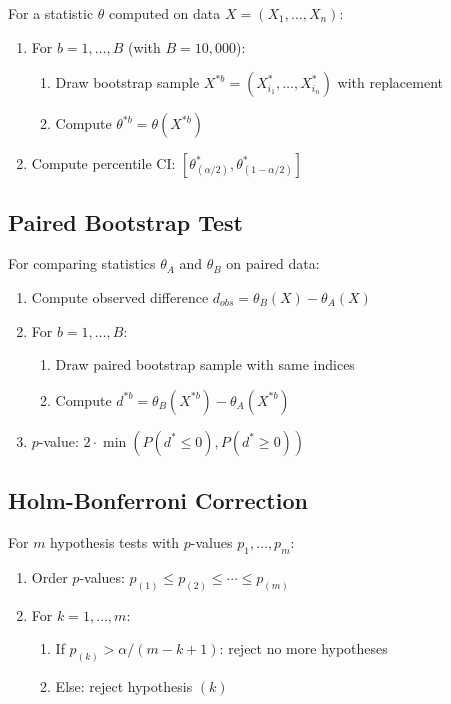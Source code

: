 For a statistic $\theta$ computed on data $X = (X_1, \ldots, X_n)$:

\begin{enumerate}
    \item For $b = 1, \ldots, B$ (with $B = 10,000$):
    \begin{enumerate}
        \item Draw bootstrap sample $X^{*b} = (X_{i_1}^*, \ldots, X_{i_n}^*)$ with replacement
        \item Compute $\theta^{*b} = \theta(X^{*b})$
    \end{enumerate}
    \item Compute percentile CI: $[\theta^*_{(\alpha/2)}, \theta^*_{(1-\alpha/2)}]$
\end{enumerate}

\subsection{Paired Bootstrap Test}

For comparing statistics $\theta_A$ and $\theta_B$ on paired data:

\begin{enumerate}
    \item Compute observed difference $d_{obs} = \theta_B(X) - \theta_A(X)$
    \item For $b = 1, \ldots, B$:
    \begin{enumerate}
        \item Draw paired bootstrap sample with same indices
        \item Compute $d^{*b} = \theta_B(X^{*b}) - \theta_A(X^{*b})$
    \end{enumerate}
    \item $p$-value: $2 \cdot \min(P(d^* \leq 0), P(d^* \geq 0))$
\end{enumerate}

\subsection{Holm-Bonferroni Correction}

For $m$ hypothesis tests with $p$-values $p_1, \ldots, p_m$:

\begin{enumerate}
    \item Order $p$-values: $p_{(1)} \leq p_{(2)} \leq \cdots \leq p_{(m)}$
    \item For $k = 1, \ldots, m$:
    \begin{enumerate}
        \item If $p_{(k)} > \alpha / (m - k + 1)$: reject no more hypotheses
        \item Else: reject hypothesis $(k)$
    \end{enumerate}
\end{enumerate}

